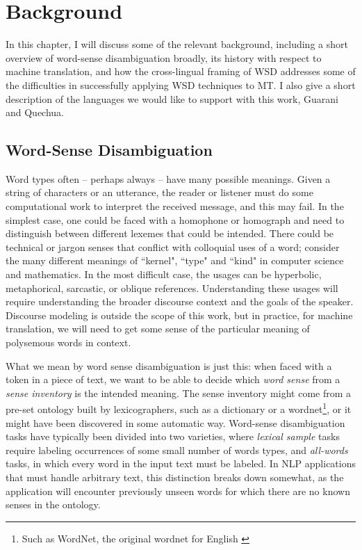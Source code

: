 \chapter{Background}
\label{chap:background}

In this chapter, I will discuss some of the relevant background, including a
short overview of word-sense disambiguation broadly, its history with respect
to machine translation, and how the cross-lingual framing of WSD addresses some
of the difficulties in successfully applying WSD techniques to MT. I also give
a short description of the languages we would like to support with this work,
Guarani and Quechua.

\section{Word-Sense Disambiguation}
\label{sec:background-wsd}
Word types often -- perhaps always -- have many possible meanings. Given a
string of characters or an utterance, the reader or listener must do some
computational work to interpret the received message, and this may fail.
In the simplest case, one could be faced with
a homophone or homograph and need to distinguish between different lexemes that
could be intended. There could be technical or jargon senses that conflict with
colloquial uses of a word; consider the many different meanings of ``kernel",
``type" and ``kind" in computer science and mathematics. In the most difficult
case, the usages can be hyperbolic, metaphorical, sarcastic, or oblique
references. Understanding these usages will require understanding the broader
discourse context and the goals of the speaker. Discourse modeling is outside
the scope of this work, but in practice, for machine translation, we will need
to get some sense of the particular meaning of polysemous words in context.

What we mean by word sense disambiguation is just this:
when faced with a token in a piece of text, we want to be able to
decide which \emph{word sense} from a \emph{sense inventory} is the intended
meaning. The sense inventory might come from a pre-set ontology built by
lexicographers, such as a
dictionary or a wordnet\footnote{Such as WordNet\textregistered, 
the original wordnet for English \cite{DBLP:journals/cacm/Miller95}}, or it
might have been discovered in some automatic
way. Word-sense disambiguation tasks have typically been divided into two
varieties, where \emph{lexical sample} tasks require labeling occurrences of
some small number of words types, and \emph{all-words} tasks, in which every
word in the input text must be labeled. In NLP applications that must handle
arbitrary text, this distinction breaks down somewhat, as the application will
encounter previously unseen words for which there are no known senses in the
ontology.

